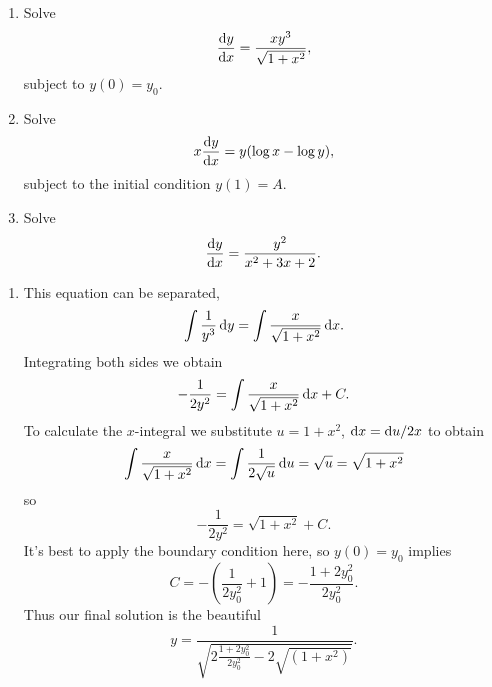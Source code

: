 \documentclass[a4paper, 12pt]{article}
\begin{document}
%

\begin{enumerate}[label={\bf \arabic{*}.\;}, ref={\arabic{*}},itemsep=3ex, left=0ex]

    {
      \begin{enumerate}[label=(\alph{*})]
        \item Solve
          \begin{equation}
            \fd{y}{x}= \frac{xy^{3}}{\sqrt{1+x^{2}}},
          \end{equation}
          subject to $y(0) = y_{0}$.

        \item Solve
          \begin{equation}
            x\fd{y}{x}= y(\log x-\log y),
          \end{equation}
          subject to the initial condition $y(1)= A$.

        \item Solve
          \begin{equation}
            \fd{y}{x}= \frac{y^{2}}{x^{2}+3x+2}.
          \end{equation}
      \end{enumerate}
    }
    {
      \begin{enumerate}[label=(\alph{*})]
        \item This equation can be separated,
          \begin{equation}
            \int \frac{1}{y^{3}}\,{\mathrm d} y = \int \frac{x}{\sqrt{1+x^{2}}}\,{\mathrm d} x.
          \end{equation}
          Integrating both sides we obtain
          \begin{equation}
            -\frac{1}{2y^{2}}= \int \frac{x}{\sqrt{1+x^{2}}}\, {\mathrm d} x + C.
          \end{equation}
          To calculate the $x$-integral we substitute $u=1+x^{2}$, ${\mathrm d} x = {\mathrm d} u/2x$ to obtain
          \begin{equation}\int \frac{x}{\sqrt{1+x^{2}}}\,{\mathrm d} x =
            \int\frac{1}{2\sqrt{u}}\,{\mathrm d}{u}= \sqrt{u}= \sqrt{1+x^{2}}
          \end{equation} so
          \begin{equation}
            -\frac{1}{2y^{2}}=\sqrt{1+x^{2}}+ C.
          \end{equation}
          It's best to apply the boundary condition here, so $y(0)= y_{0}$ implies
          \begin{equation}
            C = -\left(\frac{1}{2y_{0}^{2}}+ 1\right) = -\frac{1+2y_{0}^{2}}{2y_{0}^{2}}.
          \end{equation}
          Thus our final solution is the beautiful
          \begin{equation}
            y = \frac{1}{\sqrt{2\frac{1+2y_{0}^{2}}{2 y_{0}^{2}} - 2\sqrt{(1+x^{2})}}}.
          \end{equation}


\end{enumerate}}
\end{enumerate}
\end{document}
